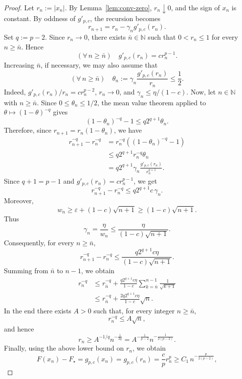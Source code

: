 \documentclass[11pt]{article}
\newcommand{\N}{\mathbb{N}}
\begin{document}
\begin{proof}
Let \(r_n:=|x_n|\). By Lemma~\ref{lem:conv-zero}, \(r_n\downarrow0\), and the sign of \(x_n\) is constant. By oddness of \(g'_{p,c}\), the recursion becomes
\[
    r_{n+1}
    =
    r_n-\gamma_ng'_{p,c}(r_n).
\]
Set \(q:=p-2\). Since \(r_n\to0\), there exists \(\bar{n}\in\N\) such that \(0<r_n\le1\) for every \(n\ge \bar{n}\). Hence
\[
(\forall\,n\geq \bar{n})\quad    g'_{p,c}(r_n)=cr_n^{p-1}.
\]
Increasing \(\bar{n}\), if necessary, we may also assume that
\[
(\forall\,n\geq \bar{n})\quad
    \theta_n
    :=
    \gamma_n\frac{g'_{p,c}(r_n)}{r_n}
    \le \frac12.
\]
Indeed, \(g'_{p,c}(r_n)/r_n=cr_n^{p-2}\), \(r_n\to0\), and \(\gamma_n\le\eta/(1-c)\).
Now, let $n\in \N$ with $n\geq \bar{n}$.
Since \(0\le\theta_n\le1/2\), the mean value theorem applied to \(\theta\mapsto(1-\theta)^{-q}\) gives
\[
    (1-\theta_n)^{-q}-1
    \le
    q2^{q+1}\theta_n.
\]
Therefore, since \(r_{n+1}=r_n(1-\theta_n)\), we have
\[
\begin{aligned}
    r_{n+1}^{-q}-r_n^{-q}
    &=
    r_n^{-q}\left((1-\theta_n)^{-q}-1\right) \\
    &\le
    q2^{q+1}r_n^{-q}\theta_n \\
    &=
    q2^{q+1}\gamma_n
    \frac{g'_{p,c}(r_n)}{r_n^{q+1}}.
\end{aligned}
\]
Since \(q+1=p-1\) and \(g'_{p,c}(r_n)=cr_n^{p-1}\), we get
\[
    r_{n+1}^{-q}-r_n^{-q}
    \le
    q2^{q+1}c\,\gamma_n.
\]
Moreover,
\[
    w_n
    \ge
    \varepsilon+(1-c)\sqrt{n+1}
    \ge
    (1-c)\sqrt{n+1}.
\]
Thus
\[
    \gamma_n
    =
    \frac{\eta}{w_n}
    \le
    \frac{\eta}{(1-c)\sqrt{n+1}}.
\]
Consequently, for every \(n\ge \bar{n}\),
\[
    r_{n+1}^{-q}-r_n^{-q}
    \le
    \frac{q2^{q+1}c\eta}{(1-c)\sqrt{n+1}}.
\]
Summing from \(\bar{n}\) to \(n-1\), we obtain
\[
\begin{aligned}
    r_n^{-q}
    &\le
    r_{\bar{n}}^{-q}
    +
    \frac{q2^{q+1}c\eta}{1-c}
    \sum_{k=\bar{n}}^{n-1}\frac1{\sqrt{k+1}}  \\
    &\le
    r_{\bar{n}}^{-q}
    +
    \frac{2q2^{q+1}c\eta}{1-c}\sqrt n.
\end{aligned}
\]
In the end there exists \(A>0\) such that, for every integer $n\geq \bar{n}$,
\[
    r_n^{-q}\le A\sqrt n,
\]
and hence
\[
    r_n
    \ge
    A^{-1/q}n^{-\frac1{2q}}
    =
    A^{-\frac1{p-2}}n^{-\frac1{2(p-2)}}.
\]
Finally, using the above lower bound on \(r_n\), we obtain
\[
    F(x_n)-F_\star
    =
    g_{p,c}(x_n)
    =
    g_{p,c}(r_n) = \frac{c}{p}r_n^p
    \ge
    C_1\,
    n^{-\frac{p}{2(p-2)}},
\]
\end{proof}
\end{document}
